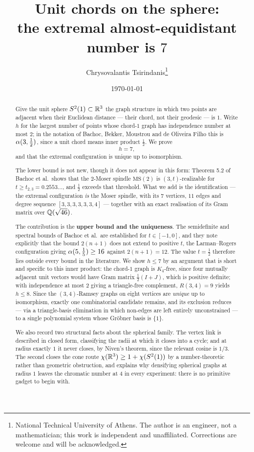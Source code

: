 \documentclass[11pt,a4paper]{article}
\title{\bfseries Unit chords on the sphere:\\ the extremal almost-equidistant
number is $7$}
\author{Chrysovalantis Tsirindanis\thanks{National Technical University of
Athens. The author is an engineer, not a mathematician; this work is
independent and unaffiliated. Corrections are welcome and will be
acknowledged.}}
\date{\today}
\begin{document}
\maketitle

\begin{abstract}
\noindent
Give the unit sphere $S^2(1)\subset\mathbb{R}^3$ the graph structure in which two
points are adjacent when their Euclidean distance --- their chord, not their
geodesic --- is $1$. Write $h$ for the largest number of points whose chord-$1$
graph has independence number at most $2$; in the notation of Bachoc, Bekker,
Moustrou and de Oliveira Filho this is $\alpha(3,\tfrac12)$, since a unit chord
means inner product $\tfrac12$. We prove
\[
h=7,
\]
and that the extremal configuration is unique up to isomorphism.

The lower bound is not new, though it does not appear in this form: Theorem 5.2
of Bachoc et al.\ shows that the $2$-Moser spindle $\mathrm{MS}(2)$ is
$(3,t)$-realizable for $t\ge t_{2,3}=0.2553\ldots$, and $\tfrac12$ exceeds that
threshold. What we add is the identification --- the extremal configuration
\emph{is} the Moser spindle, with its $7$ vertices, $11$ edges and degree
sequence $[3,3,3,3,3,3,4]$ --- together with an exact realisation of its Gram
matrix over $\mathbb{Q}(\sqrt{46})$.

The contribution is the \textbf{upper bound and the uniqueness}. The
semidefinite and spectral bounds of Bachoc et al.\ are established for
$t\in[-1,0]$, and they note explicitly that the bound $2(n+1)$ does not extend
to positive $t$, the Larman--Rogers configuration giving $\alpha(5,\tfrac15)\ge16$
against $2(n+1)=12$. The value $t=\tfrac12$ therefore lies outside every bound
in the literature. We show $h\le7$ by an argument that is short and specific to
this inner product: the chord-$1$ graph is $K_4$-free, since four mutually
adjacent unit vectors would have Gram matrix $\tfrac12(I+J)$, which is positive
definite; with independence at most $2$ giving a triangle-free complement,
$R(3,4)=9$ yields $h\le8$. Since the $(3,4)$-Ramsey graphs on eight vertices are
\emph{unique} up to isomorphism, exactly one combinatorial candidate remains,
and its exclusion reduces --- via a triangle-basis elimination in which
non-edges are left entirely unconstrained --- to a single polynomial system
whose Gr\"obner basis is $\{1\}$.

We also record two structural facts about the spherical family. The vertex link
is described in closed form, classifying the radii at which it closes into a
cycle; and at radius exactly $1$ it never closes, by Niven's theorem, since the
relevant cosine is $1/3$. The second closes the cone route
$\chi(\mathbb{R}^3)\ge1+\chi(S^2(1))$ by a number-theoretic rather than geometric
obstruction, and explains why densifying spherical graphs at radius $1$ leaves
the chromatic number at $4$ in every experiment: there is no primitive gadget to
begin with.
\end{abstract}





\end{document}
